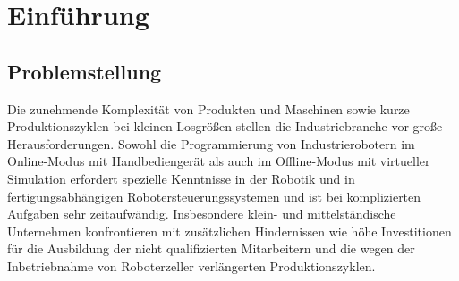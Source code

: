 \documentclass[14pt,a4paper,titlepage]{article}
\begin{document}
	\begin{abstract}
		
		Ich möchte mich beim Prof. Stefan Bischoff bedanken, dass er mein Betreuer an der Hochschule ist, und mich bei dem Praktikum unterstützt. 
		\bigbreak
		Ich möchte auch Dr. Dai Fan, meinem Betreuer bei ABB Forschungszentrum danken. In meinem Praktikum hat er mir bei theoretischer Fachkenntnisse und auch bei praktischer Anwendungsbereich viele Unterstützung gegeben. Er hat mir alles klar erklärt mit viel Geduld und Verständnis. 
	\end{abstract}
	\renewcommand{\abstractname}{Selbständigkeitserklärung}
	\begin{abstract}
		
		Ich versichere hiermit, dass ich meine Praxisarbeit mit dem Thema „Untersuchung und Implementierung von Methoden der CAD-gestützten Roboterprogrammierung“ selbstständig verfasst und keine anderen als die angegebenen Quellen und Hilfsmittel benutzt habe. Ich versichere zudem, dass die eingereichte elektronische Fassung mit der gedruckten Fassung übereinstimmt.
		\bigbreak
		Die Arbeit wurde bisher keiner anderen Prüfungsbehörde vorgelegt und auch noch nicht veröffentlicht.
		\vfill
		\begin{minipage}{2.0in}
			{\large \underline{Mannheim, \today}
			\\ Ort, Datum}
		\end{minipage}
		\hfill
		\begin{minipage}{2.0in}
			{\large \underline{\hspace{3cm}Dongliang Cao}
				\\ Unterschrift}
		\end{minipage}
	\end{abstract}
	\tableofcontents
	\pagebreak
	\section{Einführung}
	\subsection{Problemstellung}
		Die zunehmende Komplexität von Produkten und Maschinen sowie kurze Produktionszyklen bei kleinen Losgrößen stellen die Industriebranche vor große Herausforderungen. Sowohl die Programmierung von Industrierobotern im Online-Modus mit Handbediengerät als auch im Offline-Modus mit virtueller Simulation erfordert spezielle Kenntnisse in der Robotik und in fertigungsabhängigen Robotersteuerungssystemen und ist bei komplizierten Aufgaben sehr zeitaufwändig. Insbesondere klein- und mittelständische Unternehmen konfrontieren mit zusätzlichen Hindernissen wie höhe Investitionen für die Ausbildung der nicht qualifizierten Mitarbeitern und die wegen der Inbetriebnahme von Roboterzeller verlängerten Produktionszyklen.   
\end{document}
